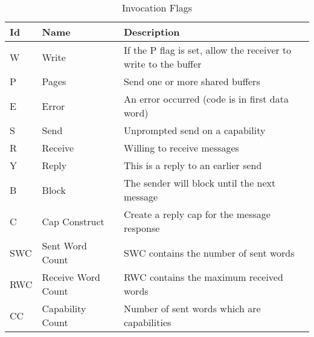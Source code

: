 \begin{table}[ht]
\begin{tabular}{l l l}
\hline\hline
Id & Name & Description \\
\hline
W & Write & If the P flag is set, allow the receiver to write to the buffer \\
P & Pages & Send one or more shared buffers \\
E & Error & An error occurred (code is in first data word) \\
S & Send & Unprompted send on a capability \\
R & Receive & Willing to receive messages \\
Y & Reply & This is a reply to an earlier send \\
B & Block & The sender will block until the next message \\
C & Cap Construct & Create a reply cap for the message response \\
SWC & Sent Word Count & SWC contains the number of sent words \\
RWC & Receive Word Count & RWC contains the maximum received words \\
CC & Capability Count & Number of sent words which are capabilities \\
\end{tabular}
\caption{Invocation Flags}
\label{table:invocation_flags}
\end{table}


